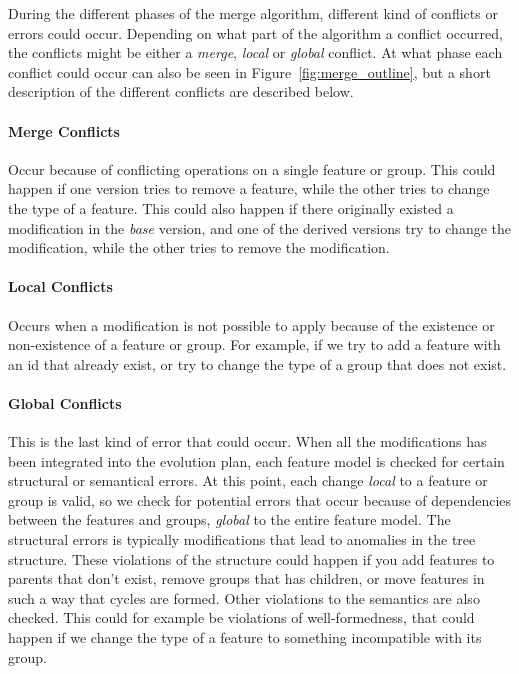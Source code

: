\documentclass[a4paper,english]{ifimaster}
\begin{document}
During the different phases of the merge algorithm, different kind of conflicts or errors could occur. Depending on what part of the algorithm a conflict occurred, the conflicts might be either a \textit{merge}, \textit{local} or \textit{global} conflict. At what phase each conflict could occur can also be seen in Figure~\vref{fig:merge_outline}, but a short description of the different conflicts are described below. 

\paragraph{Merge Conflicts}%
\label{par:merge_conflicts}

Occur because of conflicting operations on a single feature or group. This could happen if one version tries to remove a feature, while the other tries to change the type of a feature. This could also happen if there originally existed a modification in the \textit{base} version, and one of the derived versions try to change the modification, while the other tries to remove the modification.

\paragraph{Local Conflicts}%
\label{par:local_conflicts}

Occurs when a modification is not possible to apply because of the existence or non-existence of a feature or group. For example, if we try to add a feature with an id that already exist, or try to change the type of a group that does not exist.

\paragraph{Global Conflicts}%
\label{par:global_conflicts}

This is the last kind of error that could occur. When all the modifications has been integrated into the evolution plan, each feature model is checked for certain structural or semantical errors. At this point, each change \textit{local} to a feature or group is valid, so we check for potential errors that occur because of dependencies between the features and groups, \textit{global} to the entire feature model. The structural errors is typically modifications that lead to anomalies in the tree structure. These violations of the structure could happen if you add features to parents that don't exist, remove groups that has children, or move features in such a way that cycles are formed. Other violations to the semantics are also checked. This could for example be violations of well-formedness, that could happen if we change the type of a feature to something incompatible with its group.
\end{document}

